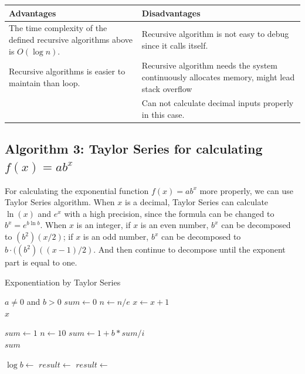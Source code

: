 \documentclass[11pt]{article}
\begin{document}
\begin{center}
\begin{tabular}{|p{7cm}|p{7cm}|}
\hline
     \textbf{Advantages} & \textbf{Disadvantages}\\ \hline
     The time complexity of the defined recursive algorithms above is $O(\log n)$. & Recursive algorithm is not easy to debug since it calls itself.\\ \hline
     Recursive algorithms is easier to maintain than loop\cite{karigl1981recursive}. & Recursive algorithm needs the system continuously allocates memory, might lead stack overflow\cite{haberman2002case} \\ \hline
      & Can not calculate decimal inputs properly in this case.\\ \hline
\end{tabular}
\end{center}

\subsection{Algorithm 3: Taylor Series for calculating $f(x) = ab^x$}
For calculating the exponential function $f(x) = ab^x$ more properly, we can use Taylor Series algorithm. When $x$ is a decimal, Taylor Series can calculate $\ln(x)$ and $e^x$ with a high precision, since the formula can be changed to $b^x = e^{b\ln b}$. When $x$ is an integer, if $x$ is an even number, $b^x$ can be decomposed to $(b^2) (x/2)$; if $x$ is an odd number, $b^x$ can be decomposed to $b\cdot ((b^2) ((x-1)/2)$. And then continue to decompose until the exponent part is equal to one\cite{abad2012algorithm}.

\begin{algorithm}
\caption{Exponentiation by Taylor Series\cite{Anu:Stack_Overflow}}\label{exp1}
\begin{algorithmic}[1]
\Require $a \neq 0$ and $b > 0$ 
\State $sum\gets 0$
    \State $n\gets n/e$
    \State $x \gets x + 1 $
\EndWhile \\
\Return $x$
\EndFunction

\State $sum\gets 1$
\State $n\gets 10$
\State $sum\gets 1+ b * sum / i$
\EndFor \\
\Return $sum$
\EndFunction

\State $\log b \gets $
\State $result \gets $
\State $result \gets $
\end{algorithmic}
\end{algorithm}
\end{document}
